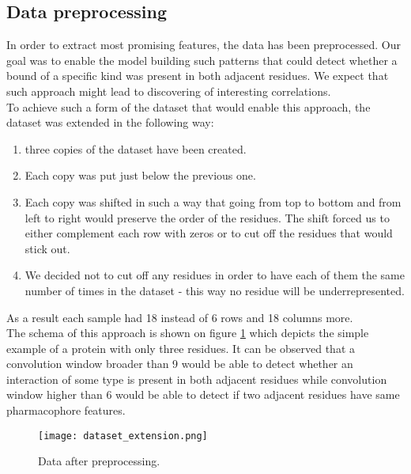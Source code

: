 \documentclass[a4paper,10pt]{report}
\begin{document}
	\subsection{Data preprocessing}\label{sec:data_processing}
	  In order to extract most promising features, the data has been preprocessed. Our goal was to enable the model building such patterns that could detect whether a bound of a specific kind was present in both adjacent residues. We expect that such approach might lead to discovering of interesting correlations.\\
	  
	  To achieve such a form of the dataset that would enable this approach, the dataset was extended in the following way:
	  \begin{enumerate}
	   \item three copies of the dataset have been created.
	   \item Each copy was put just below the previous one. 
	   \item Each copy was shifted in such a way that going from top to bottom and from left to right would preserve the order of the residues. The shift forced us to either complement each row with zeros or to cut off the residues that would stick out.
	   \item We decided not to cut off any residues in order to have each of them the same number of times in the dataset - this way no residue will be underrepresented.
	  \end{enumerate}

	  As a result each sample had 18 instead of 6 rows and 18 columns more.\\
	  
	  The schema of this approach is shown on figure \ref{fig:extended_data} which depicts the simple example of a protein with only three residues. It can be observed that a convolution window broader than 9 would be able to detect whether an interaction of some type is present in both adjacent residues while convolution window higher than 6 would be able to detect if two adjacent residues have same pharmacophore features.\\
	  
	  \begin{figure}[h!]
	    \centering
	    \texttt{[image: dataset\_extension.png]}
	    \caption{Data after preprocessing.}
	    \label{fig:extended_data}
	  \end{figure}
	  	
\end{document}
